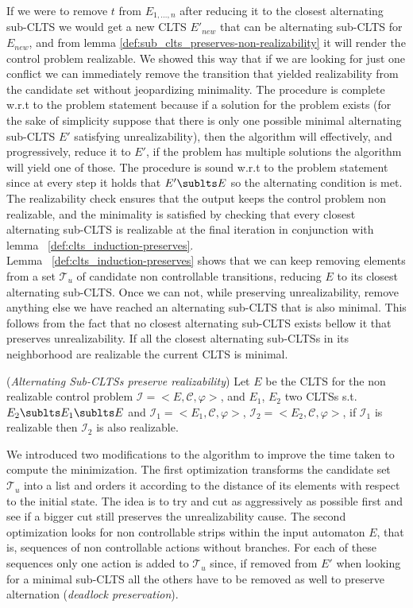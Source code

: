If we were to remove $t$ from $E_{1,\ldots,n}$ after reducing it
to the closest alternating sub-CLTS we would get a new CLTS
$E'_{new}$ that can be alternating sub-CLTS for $E_{new}$, and from lemma
\ref{def:sub_clts_preserves-non-realizability} it will render the control problem
realizable.  We showed this way that if we are looking for just one
conflict we can immediately remove the transition that yielded realizability 
from the candidate set without jeopardizing minimality.
%
The procedure is complete w.r.t to the problem statement because
if a solution for the problem exists (for the sake of simplicity
suppose that there is only one possible minimal alternating sub-CLTS $E'$
satisfying unrealizability), then the algorithm will effectively, and progressively,
reduce it to $E'$, if the problem has multiple solutions the
algorithm will yield one of those.
The procedure is sound w.r.t to the problem statement since 
at every step it holds that $E' \sublts E$ so the alternating condition
is met.  The realizability check ensures that the output keeps the
control problem non realizable, and the minimality is satisfied by
checking that every closest alternating sub-CLTS is realizable at the
final iteration in conjunction with lemma  ~\ref{def:clts_induction-preserves}.\\

Lemma ~\ref{def:clts_induction-preserves} shows that we can keep removing
elements from a set $\mathcal{T}_u$ of candidate non controllable
transitions, reducing $E$ to its closest alternating sub-CLTS.
Once we can not,
while preserving unrealizability, remove
anything else we have reached an alternating sub-CLTS that is also minimal.
This follows from the fact that
no closest alternating sub-CLTS exists bellow it that preserves unrealizability.
If all the closest alternating sub-CLTSs in its neighborhood 
are realizable the current CLTS is minimal.


\begin{lemma}\label{def:clts_induction-preserves}(\emph{Alternating Sub-CLTSs preserve realizability})
	Let $E$ be the CLTS for the non realizable control problem
	$\mathcal{I}=<E,\mathcal{C}, \varphi>$, and $E_1$, $E_2$ two CLTSs s.t. 
	$E_2 \sublts E_1 \sublts E$ and
	$\mathcal{I}_1=<E_1, \mathcal{C}, \varphi>$, $\mathcal{I}_2=<E_2, \mathcal{C}, \varphi>$, if $\mathcal{I}_1$ is realizable then $\mathcal{I}_2$ is also realizable.
\end{lemma}


We introduced two modifications to the algorithm
to improve the time taken to compute the minimization.
The first optimization transforms the candidate set $\mathcal{T}_u$
into a list and orders it according to the distance of its elements 
with respect to the initial state.  The idea is to try and cut
as aggressively as possible first and see if a bigger cut still
preserves the unrealizability cause.  The second optimization
looks for non controllable strips within the  input automaton
$E$, that is, sequences of non controllable actions without branches.
For each of these sequences only one action is
added to $\mathcal{T}_u$ since, if removed from $E'$
when looking for a minimal sub-CLTS all the others have to be removed
as well to preserve alternation (\emph{deadlock preservation}).


